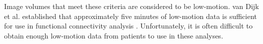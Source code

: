 Image volumes that meet these criteria are considered to be low-motion. van Dijk et al. established that approximately five minutes of low-motion data is sufficient for use in functional connectivity analysis \cite{VanDijk2012}. Unfortunately, it is often difficult to obtain enough low-motion data from patients to use in these analyses.